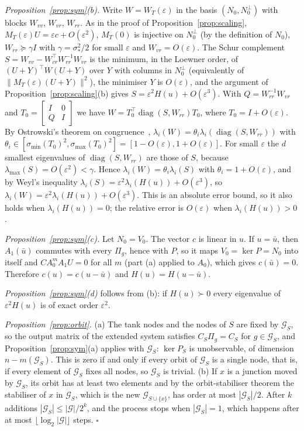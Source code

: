 \documentclass[conference]{IEEEtran}
\begin{document}
\emph{Proposition~\ref{prop:sym}(b).} Write $W=W_T(\varepsilon)$ in the basis $(N_0,N_0^\perp)$ with blocks $W_{vv}$, $W_{vr}$, $W_{rr}$. As in the proof of Proposition~\ref{prop:scaling}, $M_T(\varepsilon)U=\varepsilon c+O(\varepsilon^2)$, $M_T(0)$ is injective on $N_0^\perp$ (by the definition of $N_0$), $W_{rr}\succeq\gamma I$ with $\gamma=\sigma_*^2/2$ for small $\varepsilon$ and $W_{vr}=O(\varepsilon)$. The Schur complement $S=W_{vv}-W_{vr}^\top W_{rr}^{-1}W_{vr}$ is the minimum, in the Loewner order, of $(U+Y)^\top W(U+Y)$ over $Y$ with columns in $N_0^\perp$ (equivalently of $\|M_T(\varepsilon)(U+Y)\|^2$), the minimiser $Y$ is $O(\varepsilon)$, and the argument of Proposition~\ref{prop:scaling}(b) gives $S=\varepsilon^2H(u)+O(\varepsilon^3)$. With $Q=W_{rr}^{-1}W_{vr}$ and $T_0=\begin{bmatrix}I&0\\Q&I\end{bmatrix}$ we have $W=T_0^\top\operatorname{diag}(S,W_{rr})T_0$, where $T_0=I+O(\varepsilon)$. By Ostrowski's theorem on congruence~\cite{horn2013}, $\lambda_i(W)=\theta_i\lambda_i(\operatorname{diag}(S,W_{rr}))$ with $\theta_i\in[\sigma_{\min}(T_0)^2,\sigma_{\max}(T_0)^2]=[1-O(\varepsilon),1+O(\varepsilon)]$. For small $\varepsilon$ the $d$ smallest eigenvalues of $\operatorname{diag}(S,W_{rr})$ are those of $S$, because $\lambda_{\max}(S)=O(\varepsilon^2)<\gamma$. Hence $\lambda_i(W)=\theta_i\lambda_i(S)$ with $\theta_i=1+O(\varepsilon)$, and by Weyl's inequality $\lambda_i(S)=\varepsilon^2\lambda_i(H(u))+O(\varepsilon^3)$, so $\lambda_i(W)=\varepsilon^2\lambda_i(H(u))+O(\varepsilon^3)$. This is an absolute error bound, so it also holds when $\lambda_i(H(u))=0$; the relative error is $O(\varepsilon)$ when $\lambda_i(H(u))>0$.

\emph{Proposition~\ref{prop:sym}(c).} Let $N_0=V_0$. The vector $c$ is linear in $u$. If $u=\bar u$, then $A_1(\bar u)$ commutes with every $\Pi_g$, hence with $P$, so it maps $V_0=\ker P=N_0$ into itself and $CA_0^mA_1U=0$ for all $m$ (part (a) applied to $A_0$), which gives $c(\bar u)=0$. Therefore $c(u)=c(u-\bar u)$ and $H(u)=H(u-\bar u)$.

\emph{Proposition~\ref{prop:sym}(d)} follows from (b): if $H(u)\succ0$ every eigenvalue of $\varepsilon^2H(u)$ is of exact order $\varepsilon^2$.

\emph{Proposition~\ref{prop:orbit}.} (a) The tank nodes and the nodes of $S$ are fixed by $\mathcal G_S$, so the output matrix of the extended system satisfies $C_S\Pi_g=C_S$ for $g\in\mathcal G_S$, and Proposition~\ref{prop:sym}(a) applies with $\mathcal G_S$: $\ker P_S$ is unobservable, of dimension $n-m(\mathcal G_S)$. This is zero if and only if every orbit of $\mathcal G_S$ is a single node, that is, if every element of $\mathcal G_S$ fixes all nodes, so $\mathcal G_S$ is trivial. (b) If $x$ is a junction moved by $\mathcal G_S$, its orbit has at least two elements and by the orbit-stabiliser theorem the stabiliser of $x$ in $\mathcal G_S$, which is the new $\mathcal G_{S\cup\{x\}}$, has order at most $|\mathcal G_S|/2$. After $k$ additions $|\mathcal G_S|\le|\mathcal G|/2^k$, and the process stops when $|\mathcal G_S|=1$, which happens after at most $\lfloor\log_2|\mathcal G|\rfloor$ steps. $\square$
\end{document}
